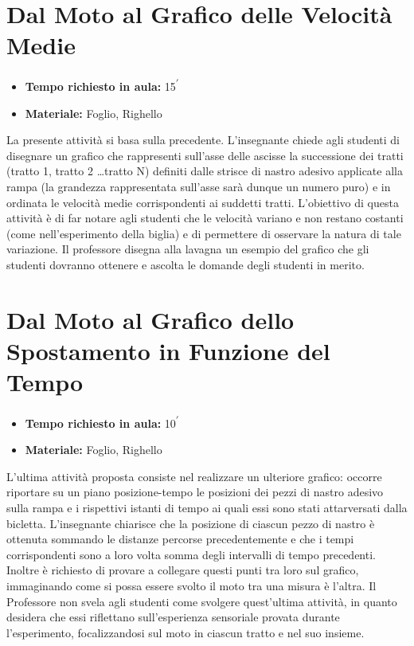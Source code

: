 \documentclass{report} \usepackage[T1]{fontenc} \usepackage[italian]{babel}
\begin{document}
\section{Dal Moto al Grafico delle Velocità Medie}
\begin{itemize}
\item \textbf{Tempo richiesto in aula:} 15\textsuperscript{$\prime$}
\item \textbf{Materiale:} Foglio, Righello
\end{itemize}

La presente attività si basa sulla precedente.
L’insegnante chiede agli studenti di disegnare un grafico che rappresenti sull'asse
delle ascisse
la successione dei tratti (tratto 1, tratto 2 \dots tratto N) definiti
dalle strisce di nastro adesivo applicate alla rampa
(la grandezza rappresentata sull'asse sarà dunque un numero puro) e
in ordinata le velocità medie corrispondenti ai suddetti tratti. L'obiettivo
di questa attività è di far notare agli studenti che le velocità variano e non
restano costanti (come nell'esperimento della biglia) e di permettere di osservare
la natura di tale variazione.
Il professore disegna alla lavagna un esempio del grafico che gli studenti
dovranno ottenere e ascolta le domande degli studenti in merito.

\section{Dal Moto al Grafico dello Spostamento in Funzione del Tempo}

\begin{itemize}
\item \textbf{Tempo richiesto in aula:} 10\textsuperscript{$\prime$}
\item \textbf{Materiale:} Foglio, Righello
\end{itemize}

L’ultima attività proposta consiste nel realizzare un ulteriore grafico:
occorre riportare su un piano posizione-tempo le
posizioni dei pezzi di nastro adesivo sulla rampa e i rispettivi istanti di
tempo ai quali essi sono stati attarversati dalla bicletta. L’insegnante
chiarisce che la posizione di ciascun pezzo di nastro è
ottenuta sommando le distanze percorse precedentemente e che i tempi
corrispondenti sono a loro volta somma degli intervalli di tempo precedenti.
Inoltre è richiesto di provare a collegare questi punti tra loro sul grafico,
immaginando come si possa essere svolto il moto tra una misura è l'altra.
Il Professore non svela agli studenti come svolgere quest’ultima
attività, in quanto desidera che essi riflettano sull'esperienza sensoriale
provata durante l’esperimento, focalizzandosi sul moto in ciascun
tratto e nel suo insieme.
\end{document}
